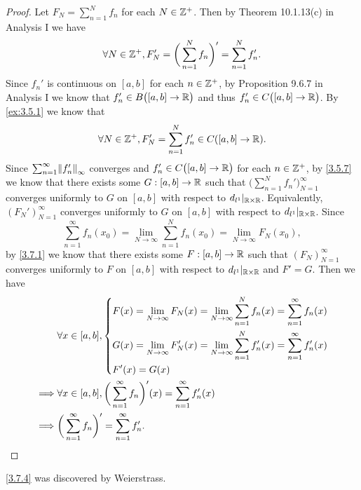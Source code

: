\begin{proof}
  Let \(F_N = \sum_{n = 1}^N f_n\) for each \(N \in \mathbb{Z}^+\).
  Then by Theorem 10.1.13(c) in Analysis I we have
  \[
    \forall N \in \mathbb{Z}^+, F_N' = \bigg(\sum_{n = 1}^N f_n\bigg)' = \sum_{n = 1}^N f_n'.
  \]
  Since \(f_n'\) is continuous on \([a, b]\) for each \(n \in \mathbb{Z}^+\), by Proposition 9.6.7 in Analysis I we know that \(f_n' \in B\big([a, b] \to \mathbb{R}\big)\) and thus \(f_n' \in C\big([a, b] \to \mathbb{R}\big)\).
  By \cref{ex:3.5.1} we know that
  \[
    \forall N \in \mathbb{Z}^+, F_N' = \sum_{n = 1}^N f_n' \in C([a, b] \to \mathbb{R}).
  \]
  Since \(\sum_{n = 1}^\infty \norm*{f_n'}_\infty\) converges and \(f_n' \in C\big([a, b] \to \mathbb{R}\big)\) for each \(n \in \mathbb{Z}^+\), by \cref{3.5.7} we know that there exists some \(G : [a, b] \to \mathbb{R}\) such that \(\big(\sum_{n = 1}^N f_n'\big)_{N = 1}^\infty\) converges uniformly to \(G\) on \([a, b]\) with respect to \(d_{l^1}|_{\mathbb{R} \times \mathbb{R}}\).
  Equivalently, \((F_N')_{N = 1}^\infty\) converges uniformly to \(G\) on \([a, b]\) with respect to \(d_{l^1}|_{\mathbb{R} \times \mathbb{R}}\).
  Since
  \[
    \sum_{n = 1}^\infty f_n(x_0) = \lim_{N \to \infty} \sum_{n = 1}^N f_n(x_0) = \lim_{N \to \infty} F_N(x_0),
  \]
  by \cref{3.7.1} we know that there exists some \(F : [a, b] \to \mathbb{R}\) such that \((F_N)_{N = 1}^\infty\) converges uniformly to \(F\) on \([a, b]\) with respect to \(d_{l^1}|_{\mathbb{R} \times \mathbb{R}}\) and \(F' = G\).
  Then we have
  \begin{align*}
             & \forall x \in [a, b], \begin{dcases}
                                       F(x) = \lim_{N \to \infty} F_N(x) = \lim_{N \to \infty} \sum_{n = 1}^N f_n(x) = \sum_{n = 1}^\infty f_n(x)    \\
                                       G(x) = \lim_{N \to \infty} F_N'(x) = \lim_{N \to \infty} \sum_{n = 1}^N f_n'(x) = \sum_{n = 1}^\infty f_n'(x) \\
                                       F'(x) = G(x)
                                     \end{dcases} \\
    \implies & \forall x \in [a, b], \bigg(\sum_{n = 1}^\infty f_n\bigg)'(x) = \sum_{n = 1}^\infty f_n'(x)                                         \\
    \implies & \bigg(\sum_{n = 1}^\infty f_n\bigg)' = \sum_{n = 1}^\infty f_n'.
  \end{align*}
\end{proof}

\begin{note}
  \cref{3.7.4} was discovered by Weierstrass.
\end{note}

